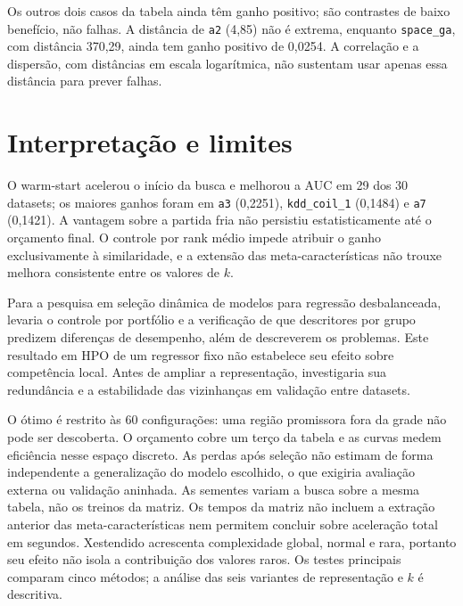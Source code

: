 \documentclass[10pt,a4paper]{article}
\begin{document}
Os outros dois casos da tabela ainda têm ganho positivo; são contrastes de baixo benefício, não falhas. A distância de \texttt{a2} (4,85) não é extrema, enquanto \texttt{space\_ga}, com distância 370,29, ainda tem ganho positivo de 0,0254. A correlação e a dispersão, com distâncias em escala logarítmica, não sustentam usar apenas essa distância para prever falhas.

\section{Interpretação e limites}
O warm-start acelerou o início da busca e melhorou a AUC em 29 dos 30 datasets; os maiores ganhos foram em \texttt{a3} (0,2251), \texttt{kdd\_coil\_1} (0,1484) e \texttt{a7} (0,1421). A vantagem sobre a partida fria não persistiu estatisticamente até o orçamento final. O controle por rank médio impede atribuir o ganho exclusivamente à similaridade, e a extensão das meta-características não trouxe melhora consistente entre os valores de $k$.

Para a pesquisa em seleção dinâmica de modelos para regressão desbalanceada, levaria o controle por portfólio e a verificação de que descritores por grupo predizem diferenças de desempenho, além de descreverem os problemas. Este resultado em HPO de um regressor fixo não estabelece seu efeito sobre competência local. Antes de ampliar a representação, investigaria sua redundância e a estabilidade das vizinhanças em validação entre datasets.

O ótimo é restrito às 60 configurações: uma região promissora fora da grade não pode ser descoberta. O orçamento cobre um terço da tabela e as curvas medem eficiência nesse espaço discreto. As perdas após seleção não estimam de forma independente a generalização do modelo escolhido, o que exigiria avaliação externa ou validação aninhada. As sementes variam a busca sobre a mesma tabela, não os treinos da matriz. Os tempos da matriz não incluem a extração anterior das meta-características nem permitem concluir sobre aceleração total em segundos. Xestendido acrescenta complexidade global, normal e rara, portanto seu efeito não isola a contribuição dos valores raros. Os testes principais comparam cinco métodos; a análise das seis variantes de representação e $k$ é descritiva.
\end{document}
